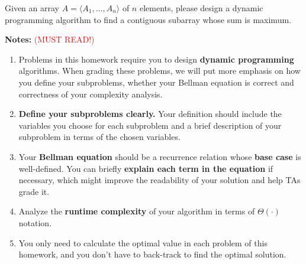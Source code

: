 
Given an array $A=\langle A_1, \dots, A_n\rangle$ of $n$ elements, please design a dynamic programming algorithm to find a contiguous subarray whose sum is maximum.

\vspace{0.05in}
{\large\textbf{Notes:}} \textcolor{red}{(MUST READ!)}

\begin{enumerate}
	\item Problems in this homework require you to design \textbf{dynamic programming} algorithms. When grading these problems, we will put more emphasis on how you define your subproblems, whether your Bellman equation is correct and correctness of your complexity analysis.
	\item \textbf{Define your subproblems clearly.} Your definition should include the variables you choose for each subproblem and a brief description of your subproblem in terms of the chosen variables.
	\item Your \textbf{Bellman equation} should be a recurrence relation whose \textbf{base case} is well-defined. You can briefly \textbf{explain each term in the equation} if necessary, which might improve the readability of your solution and help TAs grade it. 
	\item Analyze the \textbf{runtime complexity} of your algorithm in terms of $\Theta(\cdot)$ notation.
	\item You only need to calculate the optimal value in each problem of this homework, and you don't have to back-track to find the optimal solution.
\end{enumerate}

\newcommand{\maxi}[2]{\max\left\{#1,\ #2\right\}}	%
\newcommand{\maxt}[3]{\max\begin{cases}#1\\#2\\#3\end{cases}}	%
\newcommand{\mini}[2]{\min\left\{#1,\ #2\right\}}	%
\newcommand{\mint}[3]{\min\begin{cases}#1\\#2\\#3\end{cases}}	%
\newcommand{\case}[1]{\text{if}\ #1}	%
\newcommand{\otherwise}{\text{otherwise}}	%

